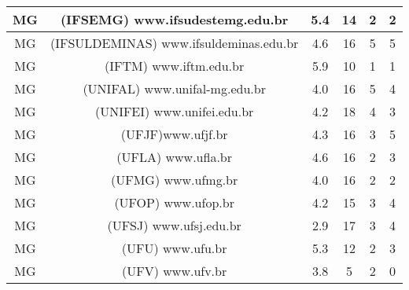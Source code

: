\begin{center}
\begin{longtable}{|c|l|l|l|l|l|}
\hline
\multicolumn{1}{|c|}{MG} & \multicolumn{1}{c|}{(IFSEMG) www.ifsudestemg.edu.br} & \multicolumn{1}{c|}{5.4} & \multicolumn{1}{c|}{14} & \multicolumn{1}{c|}{2} & \multicolumn{1}{c|}{2} \\ 
\hline
\multicolumn{1}{|c|}{MG} & \multicolumn{1}{c|}{(IFSULDEMINAS) www.ifsuldeminas.edu.br} & \multicolumn{1}{c|}{4.6} & \multicolumn{1}{c|}{16} & \multicolumn{1}{c|}{5} & \multicolumn{1}{c|}{5} \\ 
\hline
\multicolumn{1}{|c|}{MG} & \multicolumn{1}{c|}{(IFTM) www.iftm.edu.br} & \multicolumn{1}{c|}{5.9} & \multicolumn{1}{c|}{10} & \multicolumn{1}{c|}{1} & \multicolumn{1}{c|}{1} \\ 
\hline
\multicolumn{1}{|c|}{MG} & \multicolumn{1}{c|}{(UNIFAL) www.unifal-mg.edu.br} & \multicolumn{1}{c|}{4.0} & \multicolumn{1}{c|}{16} & \multicolumn{1}{c|}{5} & \multicolumn{1}{c|}{4} \\ 
\hline
\multicolumn{1}{|c|}{MG} & \multicolumn{1}{c|}{(UNIFEI) www.unifei.edu.br} & \multicolumn{1}{c|}{4.2} & \multicolumn{1}{c|}{18} & \multicolumn{1}{c|}{4} & \multicolumn{1}{c|}{3} \\ 
\hline
\multicolumn{1}{|c|}{MG} & \multicolumn{1}{c|}{(UFJF)www.ufjf.br} & \multicolumn{1}{c|}{4.3} & \multicolumn{1}{c|}{16} & \multicolumn{1}{c|}{3} & \multicolumn{1}{c|}{5} \\ 
\hline
\multicolumn{1}{|c|}{MG} & \multicolumn{1}{c|}{(UFLA) www.ufla.br} & \multicolumn{1}{c|}{4.6} & \multicolumn{1}{c|}{16} & \multicolumn{1}{c|}{2} & \multicolumn{1}{c|}{3} \\ 
\hline
\multicolumn{1}{|c|}{MG} & \multicolumn{1}{c|}{(UFMG) www.ufmg.br} & \multicolumn{1}{c|}{4.0} & \multicolumn{1}{c|}{16} & \multicolumn{1}{c|}{2} & \multicolumn{1}{c|}{2} \\ 
\hline
\multicolumn{1}{|c|}{MG} & \multicolumn{1}{c|}{(UFOP) www.ufop.br} & \multicolumn{1}{c|}{4.2} & \multicolumn{1}{c|}{15} & \multicolumn{1}{c|}{3} & \multicolumn{1}{c|}{ 4} \\ 
\hline
\multicolumn{1}{|c|}{MG} & \multicolumn{1}{c|}{(UFSJ) www.ufsj.edu.br} & \multicolumn{1}{c|}{2.9} & \multicolumn{1}{c|}{17} & \multicolumn{1}{c|}{3} & \multicolumn{1}{c|}{4} \\ 
\hline
\multicolumn{1}{|c|}{MG} & \multicolumn{1}{c|}{(UFU) www.ufu.br} & \multicolumn{1}{c|}{5.3} & \multicolumn{1}{c|}{12} & \multicolumn{1}{c|}{2} & \multicolumn{1}{c|}{3} \\ 
\hline
\multicolumn{1}{|c|}{MG} & \multicolumn{1}{c|}{(UFV) www.ufv.br} & \multicolumn{1}{c|}{3.8} & \multicolumn{1}{c|}{5} & \multicolumn{1}{c|}{2} & \multicolumn{1}{c|}{0} \\ 

\end{longtable}
\end{center}
